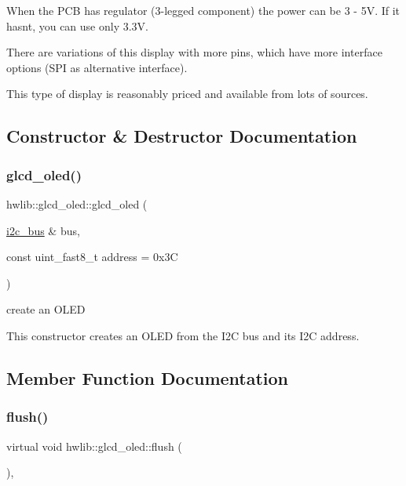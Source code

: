 When the P\+CB has regulator (3-\/legged component) the power can be 3 -\/ 5V. If it hasn\textquotesingle{}t, you can use only 3.\+3V.

There are variations of this display with more pins, which have more interface options (S\+PI as alternative interface).

This type of display is reasonably priced and available from lots of sources.

 

\subsection{Constructor \& Destructor Documentation}
\mbox{\label{classhwlib_1_1glcd__oled_a263ff5913c63771b23ec6b64c4bf77e1}} 
\subsubsection{\texorpdfstring{glcd\+\_\+oled()}{glcd\_oled()}}
{\footnotesize\ttfamily hwlib\+::glcd\+\_\+oled\+::glcd\+\_\+oled (\begin{DoxyParamCaption}\item[{\hyperlink{classhwlib_1_1i2c__bus}{i2c\+\_\+bus} \&}]{bus,  }\item[{const uint\+\_\+fast8\+\_\+t}]{address = {\ttfamily 0x3C} }\end{DoxyParamCaption})\hspace{0.3cm}{\ttfamily [inline]}}



create an O\+L\+ED 

This constructor creates an O\+L\+ED from the I2C bus and its I2C address. 

\subsection{Member Function Documentation}
\mbox{\label{classhwlib_1_1glcd__oled_a58e191e5350f349facee130513a08b75}} 
\subsubsection{\texorpdfstring{flush()}{flush()}}
{\footnotesize\ttfamily virtual void hwlib\+::glcd\+\_\+oled\+::flush (\begin{DoxyParamCaption}{ }\end{DoxyParamCaption})\hspace{0.3cm}{\ttfamily [inline]}, {\ttfamily [virtual]}}



